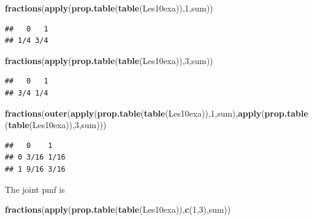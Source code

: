 \documentclass[]{book}
\newenvironment{Shaded}{\begin{snugshade}}{\end{snugshade}}
\newcommand{\KeywordTok}[1]{\textcolor[rgb]{0.13,0.29,0.53}{\textbf{#1}}}
\newcommand{\DecValTok}[1]{\textcolor[rgb]{0.00,0.00,0.81}{#1}}
\newcommand{\NormalTok}[1]{#1}
\theoremstyle{definition}
\theoremstyle{definition}
\theoremstyle{definition}
\theoremstyle{remark}
\begin{document}
\begin{Shaded}
\begin{Highlighting}[]
\KeywordTok{fractions}\NormalTok{(}\KeywordTok{apply}\NormalTok{(}\KeywordTok{prop.table}\NormalTok{(}\KeywordTok{table}\NormalTok{(Les10exa)),}\DecValTok{1}\NormalTok{,sum))}
\end{Highlighting}
\end{Shaded}

\begin{verbatim}
##   0   1 
## 1/4 3/4
\end{verbatim}

\begin{Shaded}
\begin{Highlighting}[]
\KeywordTok{fractions}\NormalTok{(}\KeywordTok{apply}\NormalTok{(}\KeywordTok{prop.table}\NormalTok{(}\KeywordTok{table}\NormalTok{(Les10exa)),}\DecValTok{3}\NormalTok{,sum))}
\end{Highlighting}
\end{Shaded}

\begin{verbatim}
##   0   1 
## 3/4 1/4
\end{verbatim}

\begin{Shaded}
\begin{Highlighting}[]
\KeywordTok{fractions}\NormalTok{(}\KeywordTok{outer}\NormalTok{(}\KeywordTok{apply}\NormalTok{(}\KeywordTok{prop.table}\NormalTok{(}\KeywordTok{table}\NormalTok{(Les10exa)),}\DecValTok{1}\NormalTok{,sum),}\KeywordTok{apply}\NormalTok{(}\KeywordTok{prop.table}\NormalTok{(}\KeywordTok{table}\NormalTok{(Les10exa)),}\DecValTok{3}\NormalTok{,sum)))}
\end{Highlighting}
\end{Shaded}

\begin{verbatim}
##   0    1   
## 0 3/16 1/16
## 1 9/16 3/16
\end{verbatim}

The joint pmf is

\begin{Shaded}
\begin{Highlighting}[]
\KeywordTok{fractions}\NormalTok{(}\KeywordTok{apply}\NormalTok{(}\KeywordTok{prop.table}\NormalTok{(}\KeywordTok{table}\NormalTok{(Les10exa)),}\KeywordTok{c}\NormalTok{(}\DecValTok{1}\NormalTok{,}\DecValTok{3}\NormalTok{),sum))}
\end{Highlighting}
\end{Shaded}
\end{document}
